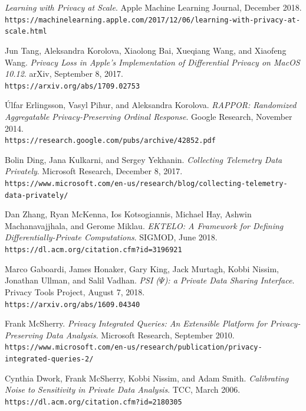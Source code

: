 \documentclass[12pt]{article}
\theoremstyle{definition}
\begin{document}
\newpage

{}

\begin{thebibliography}{9}
\textit{Learning with Privacy at Scale}. Apple Machine Learning Journal, December 2018. \\ \texttt{https://machinelearning.apple.com/2017/12/06/learning-with-privacy-at-scale.html}
 
Jun Tang, Aleksandra Korolova, Xiaolong Bai, Xueqiang Wang, and Xiaofeng Wang. \textit{Privacy Loss in Apple's Implementation of Differential Privacy on MacOS 10.12}. arXiv, September 8, 2017. \\
\texttt{https://arxiv.org/abs/1709.02753}

\'{U}lfar Erlingsson, Vasyl Pihur, and Aleksandra Korolova. \textit{RAPPOR: Randomized Aggregatable Privacy-Preserving Ordinal Response}. Google Research, November 2014. \\
\texttt{https://research.google.com/pubs/archive/42852.pdf}
 
Bolin Ding, Jana Kulkarni, and Sergey Yekhanin. \textit{Collecting Telemetry Data Privately}. Microsoft Research, December 8, 2017. \\
\texttt{https://www.microsoft.com/en-us/research/blog/collecting-telemetry-data-privately/}

Dan Zhang, Ryan McKenna, Ios Kotsogiannis, Michael Hay, Ashwin Machanavajjhala, and Gerome Miklau. \textit{EKTELO: A Framework for Defining Differentially-Private Computations}. SIGMOD, June 2018. \\
\texttt{https://dl.acm.org/citation.cfm?id=3196921}

Marco Gaboardi, James Honaker, Gary King, Jack Murtagh, Kobbi Nissim, Jonathan Ullman, and Salil Vadhan. \textit{PSI ($\mathit{\Psi}$): a Private Data Sharing Interface}. Privacy Tools Project, August 7, 2018. \\
\texttt{https://arxiv.org/abs/1609.04340}

Frank McSherry. \textit{Privacy Integrated Queries:
An Extensible Platform for Privacy-Preserving Data Analysis}. Microsoft Research, September 2010. \\
\texttt{https://www.microsoft.com/en-us/research/publication/privacy-integrated-queries-2/}

Cynthia Dwork, Frank McSherry, Kobbi Nissim, and Adam Smith. \textit{Calibrating Noise to Sensitivity in Private Data Analysis}. TCC, March 2006. \\
\texttt{https://dl.acm.org/citation.cfm?id=2180305}

\end{thebibliography}
\end{document}
